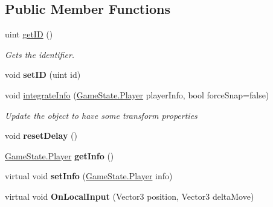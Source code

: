 \subsection*{Public Member Functions}
\begin{DoxyCompactItemize}
\item 
uint \hyperlink{class_player_reference_ae724ca461dddeed2f9671f9a745da381}{get\-I\-D} ()
\begin{DoxyCompactList}\small\item\em Gets the identifier. \end{DoxyCompactList}\item 
\hypertarget{class_player_reference_ae35eca907ad8238c4d51d65d8c021f26}{void {\bfseries set\-I\-D} (uint id)}\label{class_player_reference_ae35eca907ad8238c4d51d65d8c021f26}

\item 
void \hyperlink{class_player_reference_a4918fec4590780ff599dec4a5035bbbe}{integrate\-Info} (\hyperlink{class_game_state_1_1_player}{Game\-State.\-Player} player\-Info, bool force\-Snap=false)
\begin{DoxyCompactList}\small\item\em Update the object to have some transform properties \end{DoxyCompactList}\item 
\hypertarget{class_player_reference_a51359b5e93dc10f7e6e345196f9d14c6}{void {\bfseries reset\-Delay} ()}\label{class_player_reference_a51359b5e93dc10f7e6e345196f9d14c6}

\item 
\hypertarget{class_player_reference_ab6b15f671b1553537a50db3529a74127}{\hyperlink{class_game_state_1_1_player}{Game\-State.\-Player} {\bfseries get\-Info} ()}\label{class_player_reference_ab6b15f671b1553537a50db3529a74127}

\item 
\hypertarget{class_player_reference_aee764d4fed2e9c45ecdcfbf525bd03ed}{virtual void {\bfseries set\-Info} (\hyperlink{class_game_state_1_1_player}{Game\-State.\-Player} info)}\label{class_player_reference_aee764d4fed2e9c45ecdcfbf525bd03ed}

\item 
\hypertarget{class_player_reference_aa8c16ecb182a8b2420158d87bdcdb510}{virtual void {\bfseries On\-Local\-Input} (Vector3 position, Vector3 delta\-Move)}\label{class_player_reference_aa8c16ecb182a8b2420158d87bdcdb510}

\end{DoxyCompactItemize}

